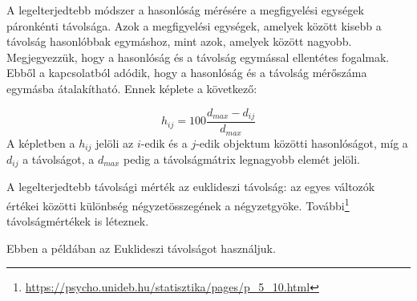 \documentclass[
  letterpaper,
]{krantz}
\renewcommand{\href}[2]{#2\footnote{\url{#1}}}
\begin{document}
A legelterjedtebb módszer a hasonlóság mérésére a megfigyelési egységek
páronkénti távolsága. Azok a megfigyelési egységek, amelyek között
kisebb a távolság hasonlóbbak egymáshoz, mint azok, amelyek között
nagyobb. Megjegyezzük, hogy a hasonlóság és a távolság egymással
ellentétes fogalmak. Ebből a kapcsolatból adódik, hogy a hasonlóság és a
távolság mérőszáma egymásba átalakítható. Ennek képlete a következő:

\[h_{ij}=100\frac{d_{max}−d_{ij}}{d_{max}}\] A képletben a \(h_{ij}\)
jelöli az \(i\)-edik és a \(j\)-edik objektum közötti hasonlóságot, míg
a \(d_{ij}\) a távolságot, a \(d_{max}\) pedig a távolságmátrix
legnagyobb elemét jelöli.

A legelterjedtebb távolsági mérték az euklideszi távolság: az egyes
változók értékei közötti különbség négyzetösszegének a négyzetgyöke.
\href{https://psycho.unideb.hu/statisztika/pages/p_5_10.html}{További}
távolságmértékek is léteznek.

Ebben a példában az Euklideszi távolságot használjuk.
\end{document}

